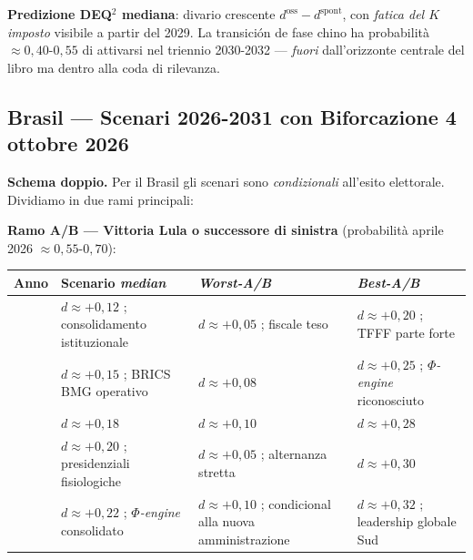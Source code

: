 \Conj{} \textbf{Predizione DEQ$^2$ mediana}: divario crescente
\(d^{\text{oss}} - d^{\text{spont}}\), con \emph{fatica del \(K\)
imposto} visibile a partir del 2029. La transición de fase chino ha
probabilità \(\approx 0{,}40\)-\(0{,}55\) di attivarsi nel triennio
2030-2032 --- \emph{fuori} dall'orizzonte centrale del libro ma dentro
alla coda di rilevanza.

\subsection{Brasil --- Scenari 2026-2031 con Biforcazione 4 ottobre
2026}\label{brasile-scenari-2026-2031-con-bifurcación-4-ottobre-2026}

\Hypoth{} \textbf{Schema doppio.} Per il Brasil gli scenari sono
\emph{condizionali} all'esito elettorale. Dividiamo in due rami
principali:

\textbf{Ramo A/B --- Vittoria Lula o successore di sinistra}
(probabilità aprile 2026 \(\approx 0{,}55\)-\(0{,}70\)):

{\def\LTcaptype{none} %
{\small\begin{longtable}[]{@{}
  >{\raggedright\arraybackslash}p{}
  >{\raggedright\arraybackslash}p{}
  >{\raggedright\arraybackslash}p{}
  >{\raggedright\arraybackslash}p{}@{}}
\toprule\noalign{}
\begin{minipage}[b]{\linewidth}\raggedright
Anno
\end{minipage} & \begin{minipage}[b]{\linewidth}\raggedright
Scenario \emph{median}
\end{minipage} & \begin{minipage}[b]{\linewidth}\raggedright
\emph{Worst-A/B}
\end{minipage} & \begin{minipage}[b]{\linewidth}\raggedright
\emph{Best-A/B}
\end{minipage} \\
\midrule\noalign{}
\endhead
\bottomrule\noalign{}
\endlastfoot
2027 & \(d \approx +0{,}12\) ; consolidamento istituzionale &
\(d \approx +0{,}05\) ; fiscale teso & \(d \approx +0{,}20\) ; TFFF
parte forte \\
2028 & \(d \approx +0{,}15\) ; BRICS BMG operativo &
\(d \approx +0{,}08\) & \(d \approx +0{,}25\) ; \emph{$\Phi$-engine}
riconosciuto \\
2029 & \(d \approx +0{,}18\) & \(d \approx +0{,}10\) &
\(d \approx +0{,}28\) \\
2030 & \(d \approx +0{,}20\) ; presidenziali fisiologiche &
\(d \approx +0{,}05\) ; alternanza stretta & \(d \approx +0{,}30\) \\
2031 & \(d \approx +0{,}22\) ; \emph{$\Phi$-engine} consolidato &
\(d \approx +0{,}10\) ; condicional alla nuova amministrazione &
\(d \approx +0{,}32\) ; leadership globale Sud \\
\end{longtable}}
}

